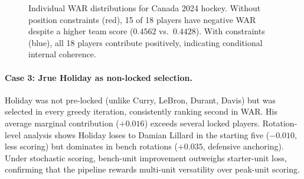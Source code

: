 \documentclass[12pt,letterpaper]{article}
\begin{document}
\begin{figure}[h]
  \centering
  \caption{Individual WAR distributions for Canada 2024 hockey.
    Without position constraints (red), 15 of 18 players have negative WAR
    despite a higher team score ($0.4562$ vs.\ $0.4428$).
    With constraints (blue), all 18 players contribute positively,
    indicating conditional internal coherence.}
  \label{fig:war-distribution}
\end{figure}

\paragraph{Case 3: Jrue Holiday as non-locked selection.}
Holiday was not pre-locked (unlike Curry, LeBron, Durant, Davis) but
was selected in every greedy iteration, consistently ranking second in
WAR.
His average marginal contribution ($+0.016$) exceeds several locked
players.
Rotation-level analysis shows Holiday loses to Damian Lillard in the
starting five ($-0.010$, less scoring) but dominates in bench rotations
($+0.035$, defensive anchoring).
Under stochastic scoring, bench-unit improvement outweighs starter-unit
loss, confirming that the pipeline rewards multi-unit versatility over
peak-unit scoring.
\end{document}
